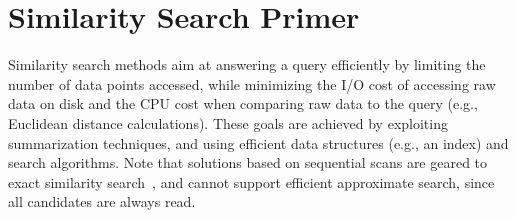 
\vspace*{-0.3cm}

\section{Similarity Search Primer}
\label{sec:approaches}

Similarity search methods aim at answering a query efficiently by limiting the number of data points accessed, %
while minimizing the I/O cost of accessing raw data on disk and the CPU cost %
when comparing raw data to the query (e.g., Euclidean distance calculations). 
These goals are achieved by exploiting summarization techniques, and using efficient data structures (e.g., an index) and search algorithms. 
Note that solutions based on sequential scans are geared to exact similarity search~\cite{conf/kdd/Mueen2012,code/Mueen2017}, and cannot support efficient approximate search, since all candidates are always read.


